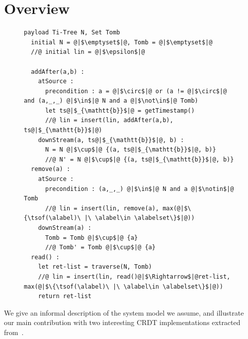 \section{Overview}
\label{sec:overview}

\begin{figure}[t]
\begin{lstlisting}[basicstyle=\ttfamily\scriptsize,caption={\vspace{-1mm}Replicated Growing Array (RGA) CRDT pseudo-code.},captionpos=b,label={lst:rga}]
  payload Ti-Tree N, Set Tomb
  initial N = @|$\emptyset$|@, Tomb = @|$\emptyset$|@
  //@ initial lin = @|$\epsilon$|@

  addAfter(a,b) :
    atSource :
      precondition : a = @|$\circ$|@ or (a != @|$\circ$|@ and (a,_,_) @|$\in$|@ N and a @|$\not\in$|@ Tomb)
      let ts@|$_{\mathtt{b}}$|@ = getTimestamp()
      //@ lin = insert(lin, addAfter(a,b), ts@|$_{\mathtt{b}}$|@)
    downStream(a, ts@|$_{\mathtt{b}}$|@, b) :
      N = N @|$\cup$|@ {(a, ts@|$_{\mathtt{b}}$|@, b)}
      //@ N' = N @|$\cup$|@ {(a, ts@|$_{\mathtt{b}}$|@, b)}
  remove(a) :
    atSource :
      precondition : (a,_,_) @|$\in$|@ N and a @|$\notin$|@ Tomb
      //@ lin = insert(lin, remove(a), max(@|$\{\tsof(\alabel)\ |\ \alabel\in \alabelset\}$|@))
    downStream(a) :
      Tomb = Tomb @|$\cup$|@ {a}
      //@ Tomb' = Tomb @|$\cup$|@ {a}
  read() :
    let ret-list = traverse(N, Tomb)
    //@ lin = insert(lin, read()@|$\Rightarrow$|@ret-list, max(@|$\{\tsof(\alabel)\ |\ \alabel\in \alabelset\}$|@))
    return ret-list
\end{lstlisting}
\vspace{-5mm}
\end{figure}

We give an informal description of the system model
we assume, and illustrate our main contribution with two
interesting CRDT implementations extracted from~\cite{AttiyaBGMYZ16,ShapiroPBZ11}.

